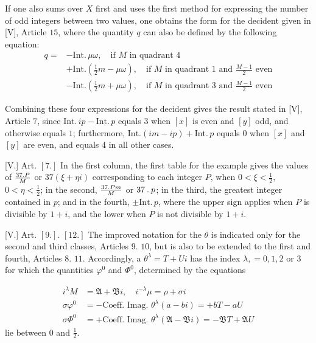 If one also sums over $X$ first and uses the first method for expressing the number of odd integers between two values, one obtains the form for the decident given in [V], Article $15$, where the quantity $q$ can also be defined by the following equation:
\[
\begin{aligned}
q={}&-\mathrm{Int.}\,\mu\omega,\quad\text{if }M\text{ in quadrant }4\text{}\\
&+\mathrm{Int.}(\tfrac12m-\mu\omega),\quad\text{if }M\text{ in quadrant }1\text{ and }\frac{M-1}{2}\text{ even}\\
&-\mathrm{Int.}(\tfrac12m+\mu\omega),\quad\text{if }M\text{ in quadrant }3\text{ and }\frac{M-1}{2}\text{ even}
\end{aligned}
\]

Combining these four expressions for the decident gives the result stated in [V], Article $7$, since $\mathrm{Int.}\,ip-\mathrm{Int.}\,p$ equals $3$ when $[x]$ is even and $[y]$ odd, and otherwise equals $1$; furthermore, $\mathrm{Int.}(im-ip)+\mathrm{Int.}\,p$ equals $0$ when $[x]$ and $[y]$ are even, and equals $4$ in all other cases.

[V.] Art. $[7.]$ In the first column, the first table for the example gives the values of $\frac{37\mathbin{.} P}{M}$ or $37(\xi+\eta i)$ corresponding to each integer $P$, when $0<\xi<\tfrac12$, $0<\eta<\tfrac12$; in the second, $\frac{37\mathbin{.} Pm}{M}$ or $37\mathbin{.} p$; in the third, the greatest integer contained in $p$; and in the fourth, $\pm\mathrm{Int.}\,p$, where the upper sign applies when $P$ is divisible by $1+i$, and the lower when $P$ is not divisible by $1+i$.

[V.] Art. $[9.]$. $[12.]$ The improved notation for the $\theta$ is indicated only for the second and third classes, Articles $9$. $10$, but is also to be extended to the first and fourth, Articles $8$. $11$. Accordingly, a $\theta^\lambda=T+Ui$ has the index $\lambda,=0,1,2$ or $3$ for which the quantities $\varphi^0$ and $\Phi^0$, determined by the equations

\[
\begin{aligned}
i^\lambda M&=\mathfrak A+\mathfrak B i,\quad i^{-\lambda}\mu=\rho+\sigma i\\
\sigma\varphi^0&=-\text{Coeff. Imag. }\theta^\lambda(a-bi)=+bT-aU\\
\sigma\Phi^0&=+\text{Coeff. Imag. }\theta^\lambda(\mathfrak A-\mathfrak B i)=-\mathfrak B T+\mathfrak A U
\end{aligned}
\]
lie between $0$ and $\tfrac12$.

